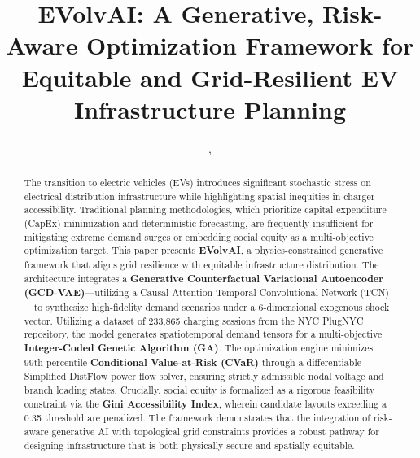 \documentclass[conference]{IEEEtran}
\begin{document}
\title{EVolvAI: A Generative, Risk-Aware Optimization Framework for\\
Equitable and Grid-Resilient EV Infrastructure Planning}

\author{,
}

 \maketitle

\begin{abstract}
The transition to electric vehicles (EVs) introduces significant stochastic stress on electrical distribution infrastructure while highlighting spatial inequities in charger accessibility. Traditional planning methodologies, which prioritize capital expenditure (CapEx) minimization and deterministic forecasting, are frequently insufficient for mitigating extreme demand surges or embedding social equity as a multi-objective optimization target. This paper presents \textbf{EVolvAI}, a physics-constrained generative framework that aligns grid resilience with equitable infrastructure distribution. The architecture integrates a \textbf{Generative Counterfactual Variational Autoencoder (GCD-VAE)}—utilizing a Causal Attention-Temporal Convolutional Network (TCN)—to synthesize high-fidelity demand scenarios under a 6-dimensional exogenous shock vector. Utilizing a dataset of 233,865 charging sessions from the NYC PlugNYC repository, the model generates spatiotemporal demand tensors for a multi-objective \textbf{Integer-Coded Genetic Algorithm (GA)}. The optimization engine minimizes 99th-percentile \textbf{Conditional Value-at-Risk (CVaR)} through a differentiable Simplified DistFlow power flow solver, ensuring strictly admissible nodal voltage and branch loading states. Crucially, social equity is formalized as a rigorous feasibility constraint via the \textbf{Gini Accessibility Index}, wherein candidate layouts exceeding a 0.35 threshold are penalized. The framework demonstrates that the integration of risk-aware generative AI with topological grid constraints provides a robust pathway for designing infrastructure that is both physically secure and spatially equitable.
\end{abstract}
\end{document}
